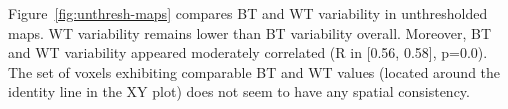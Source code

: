 \documentclass[conference]{IEEEtran}
\begin{document}

Figure~\ref{fig:unthresh-maps} compares BT and WT variability in
unthresholded maps. WT variability remains lower than BT variability
overall. Moreover, BT and WT variability appeared moderately correlated (R
in [0.56, 0.58], p=0.0). The set of voxels exhibiting comparable BT and
WT values (located around the identity line in the XY plot) does not seem to have 
any spatial consistency.

\begin{figure}[ht]
  \end{figure}
\end{document}
